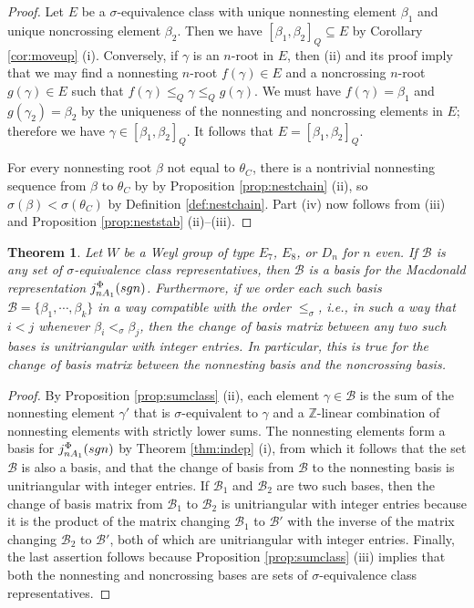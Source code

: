 \documentclass[11pt]{amsart}
\theoremstyle{plain}
\newtheorem{theorem}{Theorem}[section]
\theoremstyle{definition}
\theoremstyle{remark}
\numberwithin{equation}{subsection}
\newcommand{\be}{\beta}
\newcommand{\Z}{{\mathbb Z}}
\newcommand{\Be}{\mathcal B}
\newcommand{\macd}[2]{j^{#1}_{#2}({\rm{sgn}})}
\newcommand{\se}{\subseteq}
\begin{document}
\begin{proof}
Let $E$ be a $\sigma$-equivalence class with unique nonnesting element $\beta_1$
and unique noncrossing element $\beta_2$. Then we have $[\be_1,\be_2]_Q\se E$ by
Corollary \ref{cor:moveup} (i). Conversely, if $\gamma$ is an $n$-root in $E$,
then (ii) and its proof imply that we may find a nonnesting $n$-root
$f(\gamma)\in E$ and a noncrossing $n$-root $g(\gamma)\in E$ such that
$f(\gamma)\le_Q \gamma\le_Q g(\gamma)$. We must have $f(\gamma)=\beta_1$ and
$g(\gamma_2)=\beta_2$ by the uniqueness of the nonnesting and noncrossing elements
in $E$; therefore we have $\gamma\in [\be_1,\be_2]_Q$. It follows that
$E=[\be_1,\be_2]_Q$.

For every nonnesting root $\beta$ not equal to $\theta_C$, there is a
nontrivial nonnesting sequence from $\beta$ to $\theta_C$ by by Proposition
\ref{prop:nestchain} (ii), so $\sigma(\beta)<\sigma(\theta_C)$ by Definition
\ref{def:nestchain}.  Part (iv) now follows from (iii) and Proposition
\ref{prop:neststab} (ii)--(iii).
\end{proof}

\begin{theorem}\label{thm:nesttri}
Let $W$ be a Weyl group of type $E_7$, $E_8$, or $D_n$ for $n$ even. If $\Be$ is
any set of $\sigma$-equivalence class representatives, then $\Be$ is a basis for
the Macdonald representation $\macd{\Phi}{nA_1}$. 
Furthermore, if we order each such basis $\Be=\{\beta_1,\cdots,\beta_k\}$ in a
way compatible with the order $\le_\sigma$, i.e., in such a way that $i<j$
whenever $\beta_i<_\sigma \beta_j$, then the change of basis matrix
between any two such bases is unitriangular with integer entries. In particular,
this is true for the change of basis matrix between the nonnesting basis and the
noncrossing basis.
\end{theorem}

\begin{proof}
By Proposition \ref{prop:sumclass} (ii), each element $\gamma \in \Be$ is the
sum of the nonnesting element $\gamma'$ that is $\sigma$-equivalent to $\gamma$
and a $\Z$-linear combination of nonnesting elements with strictly lower sums.
The nonnesting elements form a basis for $\macd{\Phi}{nA_1}$ by Theorem
\ref{thm:indep} (i), from which it follows that the set $\Be$ is also a basis,
and that the change of basis from $\Be$ to the nonnesting basis is unitriangular
with integer entries. If $\Be_1$ and $\Be_2$ are two such bases, then the change
of basis matrix from $\Be_1$ to $\Be_2$ is unitriangular with integer entries
because it is the product of the matrix changing $\Be_1$ to $\Be'$ with the
inverse of the matrix changing $\Be_2$ to $\Be'$, both of which are
unitriangular with integer entries.  Finally, the last assertion follows because
Proposition \ref{prop:sumclass} (iii) implies that both the nonnesting and
noncrossing bases are sets of $\sigma$-equivalence class representatives.
\end{proof}
\end{document}
